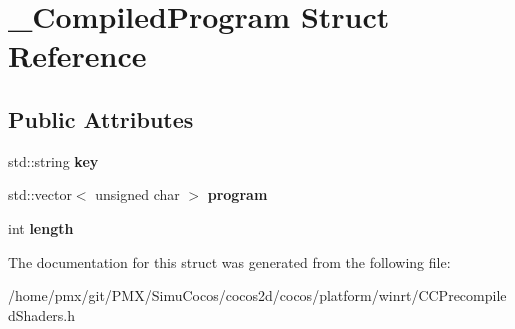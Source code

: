 \hypertarget{struct__CompiledProgram}{}\section{\+\_\+\+Compiled\+Program Struct Reference}
\label{struct__CompiledProgram}
\subsection*{Public Attributes}
\begin{DoxyCompactItemize}
\item 
\mbox{\label{struct__CompiledProgram_a231bd47a0b9b878a2cc952489e48f5d2}} 
std\+::string {\bfseries key}
\item 
\mbox{\label{struct__CompiledProgram_a1bb244d552f6a66647bf6ec6931fa2d3}} 
std\+::vector$<$ unsigned char $>$ {\bfseries program}
\item 
\mbox{\label{struct__CompiledProgram_aa15e749b2213cabf15a380efd0ff59ff}} 
int {\bfseries length}
\end{DoxyCompactItemize}


The documentation for this struct was generated from the following file\+:\begin{DoxyCompactItemize}
\item 
/home/pmx/git/\+P\+M\+X/\+Simu\+Cocos/cocos2d/cocos/platform/winrt/C\+C\+Precompiled\+Shaders.\+h\end{DoxyCompactItemize}
